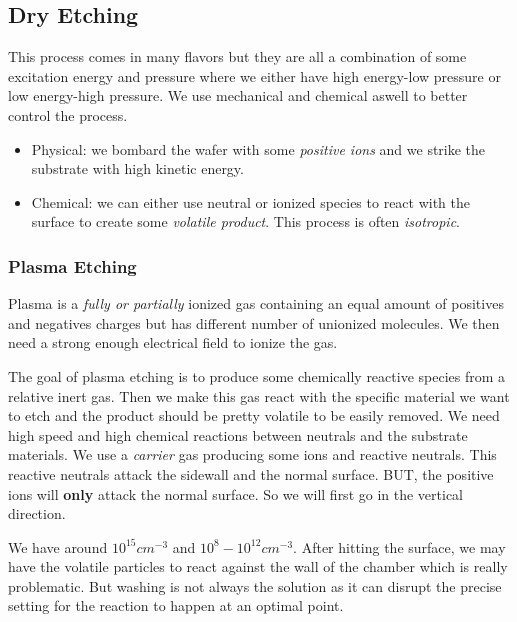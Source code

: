 \documentclass[
]{article}
\begin{document}
\hypertarget{dry-etching}{%
\subsection{Dry Etching}\label{dry-etching}}

This process comes in many flavors but they are all a combination of
some excitation energy and pressure where we either have high energy-low
pressure or low energy-high pressure. We use mechanical and chemical
aswell to better control the process.

\begin{itemize}
\item
  Physical: we bombard the wafer with some \emph{positive ions} and we
  strike the substrate with high kinetic energy.
\item
  Chemical: we can either use neutral or ionized species to react with
  the surface to create some \emph{volatile product}. This process is
  often \emph{isotropic}.
\end{itemize}

\hypertarget{plasma-etching}{%
\subsubsection{Plasma Etching}\label{plasma-etching}}

Plasma is a \emph{fully or partially} ionized gas containing an equal
amount of positives and negatives charges but has different number of
unionized molecules. We then need a strong enough electrical field to
ionize the gas.

The goal of plasma etching is to produce some chemically reactive
species from a relative inert gas. Then we make this gas react with the
specific material we want to etch and the product should be pretty
volatile to be easily removed. We need high speed and high chemical
reactions between neutrals and the substrate materials. We use a
\emph{carrier} gas producing some ions and reactive neutrals. This
reactive neutrals attack the sidewall and the normal surface. BUT, the
positive ions will \textbf{only} attack the normal surface. So we will
first go in the vertical direction.

We have around \(10^{15} cm^{-3}\) and \(10^8-10^{12} cm^{-3}\). After
hitting the surface, we may have the volatile particles to react against
the wall of the chamber which is really problematic. But washing is not
always the solution as it can disrupt the precise setting for the
reaction to happen at an optimal point.
\end{document}
